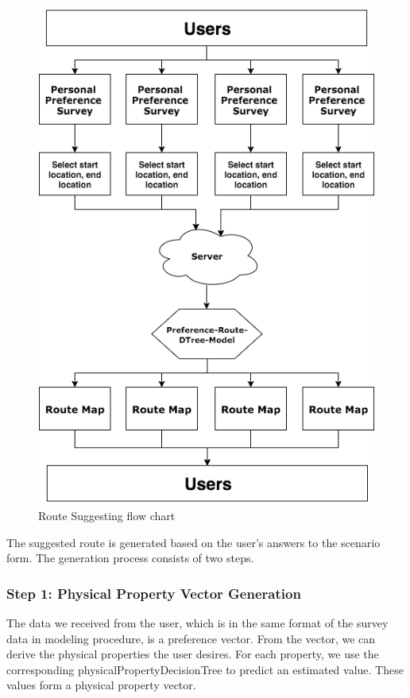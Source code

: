 \documentclass{sigchi}
\begin{document}
\begin{figure}[!h]
\centering
\includegraphics[width=1.0\columnwidth]{pics/route-suggest-work-flow.png}
\caption{Route Suggesting flow chart}
\label{fig:route-suggest-work-flow}
\end{figure}

The suggested route is generated based on the user’s answers to the scenario form. The generation process consists of two steps.

\subsubsection{Step 1: Physical Property Vector Generation}
The data we received from the user, which is in the same format of the survey data in modeling procedure,  is a preference vector. From the vector, we can derive the physical properties the user desires. For each property, we use the corresponding physicalPropertyDecisionTree to predict an estimated value. These values form a physical property vector.
\end{document}
